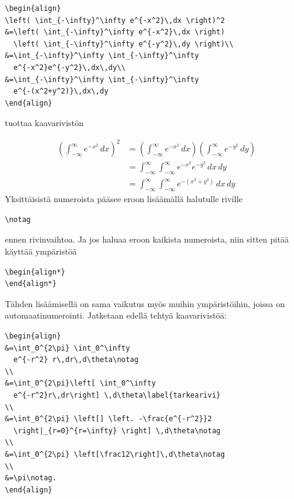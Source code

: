 \documentclass[a4paper,12 pt]{article}
\theoremstyle{plain}
\theoremstyle{definition}
\theoremstyle{remark}
\numberwithin{equation}{section}
\numberwithin{figure}{section}
\begin{document}
\begin{verbatim}
\begin{align}
\left( \int_{-\infty}^\infty e^{-x^2}\,dx \right)^2
&=\left( \int_{-\infty}^\infty e^{-x^2}\,dx \right)
  \left( \int_{-\infty}^\infty e^{-y^2}\,dy \right)\\
&=\int_{-\infty}^\infty \int_{-\infty}^\infty
  e^{-x^2}e^{-y^2}\,dx\,dy\\
&=\int_{-\infty}^\infty \int_{-\infty}^\infty
  e^{-(x^2+y^2)}\,dx\,dy
\end{align}
\end{verbatim}
tuottaa kaavarivistön

\begin{align}
\left( \int_{-\infty}^\infty e^{-x^2}\,dx \right)^2
&=\left( \int_{-\infty}^\infty e^{-x^2}\,dx \right)
  \left( \int_{-\infty}^\infty e^{-y^2}\,dy \right)\\
&=\int_{-\infty}^\infty \int_{-\infty}^\infty
  e^{-x^2}e^{-y^2}\,dx\,dy\\
&=\int_{-\infty}^\infty \int_{-\infty}^\infty
  e^{-(x^2+y^2)}\,dx\,dy
\end{align}
Yksittäisistä numeroista pääsee eroon lisäämällä halutulle riville 

\begin{verbatim}
\notag
\end{verbatim}
ennen rivinvaihtoa. Ja jos haluaa eroon kaikista numeroista, niin sitten pitää käyttää ympäristöä

\begin{verbatim}
\begin{align*}
\end{align*}
\end{verbatim}
Tähden lisäämisellä on sama vaikutus myös muihin ympäristöihin, joissa on automaatinumerointi. Jatketaan edellä tehtyä kaavarivistöä:

\begin{verbatim}
\begin{align}
&=\int_0^{2\pi} \int_0^\infty
  e^{-r^2} r\,dr\,d\theta\notag
\\
&=\int_0^{2\pi}\left[ \int_0^\infty
  e^{-r^2}r\,dr\right] \,d\theta\label{tarkearivi}
\\
&=\int_0^{2\pi} \left[] \left. -\frac{e^{-r^2}}2
  \right|_{r=0}^{r=\infty} \right] \,d\theta\notag
\\
&=\int_0^{2\pi} \left[\frac12\right]\,d\theta\notag
\\
&=\pi\notag.
\end{align}
\end{verbatim}
\end{document}
